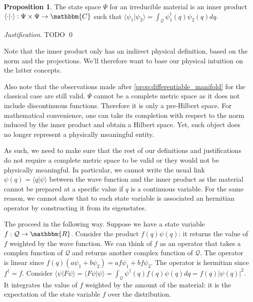 \documentclass[aps,pra,10pt,twocolumn,floatfix,nofootinbib]{revtex4-1}
\numberwithin{equation}{section}
\theoremstyle{definition}
\newtheorem{prop}[equation]{Proposition}
\newenvironment{justification}{\emph{Justification}.}{\qed}
\begin{document}
\begin{prop}\label{prop:inner_product}
	The state space $\Psi$ for an irreducible material is an inner product $\langle \cdot |\cdot \rangle : \Psi \times \Psi \rightarrow \mathbbm{C}$ such that $\langle \psi_1 | \psi_2 \rangle = \int_\mathcal{Q} \psi_1^\dagger (q) \psi_2(q) dq$.
\end{prop}
\begin{justification}
	TODO
\end{justification}

Note that the inner product only has an indirect physical definition, based on the norm and the projections. We'll therefore want to base our physical intuition on the latter concepts.

Also note that the observations made after \ref{prop:differentiable_manifold} for the  classical case are still valid. $\Psi$ cannot be a complete metric space as it does not include discontinuous functions. Therefore it is only a pre-Hilbert space. For mathematical convenience, one can take its completion with respect to the norm induced by the inner product and obtain a Hilbert space. Yet, such object does no longer represent a physically meaningful entity.

As such, we need to make sure that the rest of our definitions and justifications do not require a complete metric space to be valid or they would not be physically meaningful. In particular, we cannot write the usual link $\psi(q) = \langle q | \psi \rangle$ between the wave function and the inner product as the material cannot be prepared at a specific value if $q$ is a continuous variable. For the same reason, we cannot show that to each state variable is associated an hermitian operator by constructing it from its eigenstates.

The proceed in the following way. Suppose we have a state variable $f : \mathcal{Q} \rightarrow \mathbbm{R}$. Consider the product $f (q) \psi (q)$: it returns the value of $f$ weighted by the wave function. We can think of $f$ as an operator that takes a complex function of $\mathcal{Q}$ and returns another complex function of $\mathcal{Q}$. The operator is linear since $f (q) (a\psi_1 + b\psi_2) = a f \psi_1 + b f  \psi_2$. The operator is hermitian since $f^\dagger = f$. Consider $\langle \psi | F \psi \rangle = \langle F \psi | \psi \rangle = \int_\mathcal{Q} \psi^\dagger (q) f(q) \psi(q) dq = f(q) | \psi(q)|^2$. It integrates the value of $f$ weighted by the amount of the material: it is the expectation of the state variable $f$ over the distribution. 
\end{document}
